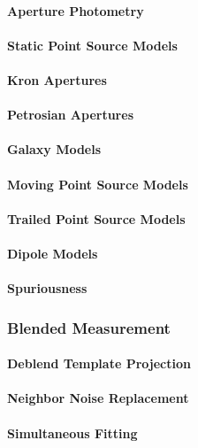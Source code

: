 \paragraph{Aperture Photometry}
\paragraph{Static Point Source Models}
\paragraph{Kron Apertures}
\paragraph{Petrosian Apertures}
\paragraph{Galaxy Models}
\paragraph{Moving Point Source Models}
\paragraph{Trailed Point Source Models}
\paragraph{Dipole Models}
\paragraph{Spuriousness}

\subsubsection{Blended Measurement}
\paragraph{Deblend Template Projection}
\paragraph{Neighbor Noise Replacement}
\label{sec:blending-replace-neighbors}
\paragraph{Simultaneous Fitting}
\label{sec:blending-simultaneous-fitting}
